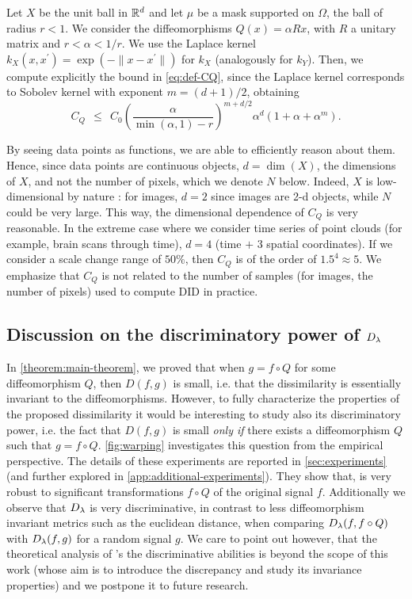 \begin{example}\label{ex:diffeo}
Let $X$ be the unit ball in $\mathbb R^d$ and let $\mu$ be a mask supported on $\Omega$, the ball of radius $r < 1$. We consider the diffeomorphisms $Q(x) = \alpha R x$, with $R$ a unitary matrix and $r < \alpha < 1/r$. We use the Laplace kernel $k_X(x,x^\prime) = \exp(-\|x-x^\prime\|)$ for $k_X$ (analogously for $k_Y$).
Then, we compute explicitly the bound in \cref{eq:def-CQ}, since the Laplace kernel corresponds to Sobolev kernel with exponent $m = (d+1)/2$, obtaining
$$C_Q ~~\leq~~ C_0 \left(\frac{\alpha}{\min(\alpha,1) - r}\right)^{m+d/2}\alpha^d (1 + \alpha + \alpha^m).$$
\end{example}
\begin{remark}
By seeing data points as functions, we are able to efficiently reason about them. Hence, since data points are continuous objects, $d=\dim(X)$, the dimensions of $X$, and not the number of pixels, which we denote $N$ below. Indeed, $X$ is low-dimensional by nature : for images, $d=2$ since images are 2-d objects, while $N$ could be very large. This way, the dimensional dependence of $C_Q$ is very reasonable. In the extreme case where we consider time series of point clouds (for example, brain scans through time), $d = 4$ (time $+$ 3 spatial coordinates). If we consider a scale change range of $50\%$, then $C_Q$ is of the order of $1.5^4 \approx 5$. We emphasize that $C_Q$ is not related to the number of samples (for images, the number of pixels) used to compute DID in practice.
\end{remark}
\subsection{Discussion on the discriminatory power of $D_\lambda$} \label{sec:discussion-selectivity}
In \cref{theorem:main-theorem}, we proved that when $g = f \circ Q$ for some diffeomorphism $Q$, then $D(f,g)$ is small, i.e. that the dissimilarity is essentially invariant to the diffeomorphisms. However, to fully characterize the properties of the proposed dissimilarity it would be interesting to study also its discriminatory power, i.e. the fact that $D(f,g)$ is small {\em only if} there exists a diffeomorphism $Q$ such that $g = f \circ Q$. \cref{fig:warping} investigates this question from the empirical perspective. The details of these experiments are reported in \cref{sec:experiments} (and further explored in \cref{app:additional-experiments}). They show that, \Diffy is very robust to significant transformations $f\circ Q$ of the original signal $f$. Additionally we observe that $D_\lambda$ is very discriminative, in contrast to less diffeomorphism invariant metrics such as the euclidean distance, when comparing $D_\lambda(f,f\circ Q)$ with $D_\lambda(f,g)$ for a random signal $g$. We care to point out however, that the theoretical analysis of \Diffy's the discriminative abilities is beyond the scope of this work (whose aim is to introduce the discrepancy and study its invariance properties) and we postpone it to future research.

